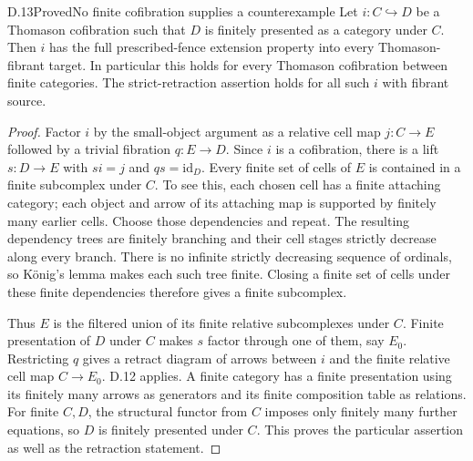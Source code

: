 \begin{claim}{D.13}{Proved}{No finite cofibration supplies a counterexample}
Let $i:C\hookrightarrow D$ be a Thomason cofibration such that $D$ is finitely presented as a category under $C$. Then $i$ has the full prescribed-fence extension property into every Thomason-fibrant target. In particular this holds for every Thomason cofibration between finite categories. The strict-retraction assertion holds for all such $i$ with fibrant source.
\end{claim}
\begin{proof}
Factor $i$ by the small-object argument as a relative cell map $j:C\to E$ followed by a trivial fibration $q:E\to D$. Since $i$ is a cofibration, there is a lift $s:D\to E$ with $si=j$ and $qs=\mathrm{id}_D$. Every finite set of cells of $E$ is contained in a finite subcomplex under $C$. To see this, each chosen cell has a finite attaching category; each object and arrow of its attaching map is supported by finitely many earlier cells. Choose those dependencies and repeat. The resulting dependency trees are finitely branching and their cell stages strictly decrease along every branch. There is no infinite strictly decreasing sequence of ordinals, so K\"onig's lemma makes each such tree finite. Closing a finite set of cells under these finite dependencies therefore gives a finite subcomplex.

Thus $E$ is the filtered union of its finite relative subcomplexes under $C$. Finite presentation of $D$ under $C$ makes $s$ factor through one of them, say $E_0$. Restricting $q$ gives a retract diagram of arrows between $i$ and the finite relative cell map $C\to E_0$. D.12 applies. A finite category has a finite presentation using its finitely many arrows as generators and its finite composition table as relations. For finite $C,D$, the structural functor from $C$ imposes only finitely many further equations, so $D$ is finitely presented under $C$. This proves the particular assertion as well as the retraction statement.
\end{proof}


